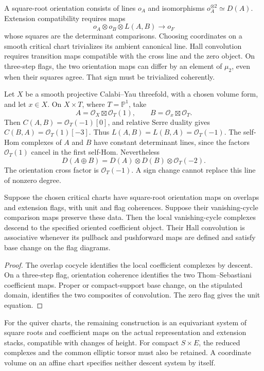 A square-root orientation consists of lines \(o_A\) and
isomorphisms \(o_A^{\otimes2}\simeq D(A)\). Extension
compatibility requires maps
\[
 o_A\otimes o_B\otimes L(A,B)\longrightarrow o_F
\]
whose squares are the determinant comparisons. Choosing coordinates
on a smooth critical chart trivializes its ambient canonical line.
Hall convolution requires transition maps compatible with the cross
line and the zero object. On three-step flags, the two orientation
maps can differ by an element of \(\mu_2\), even when their
squares agree. That sign must be trivialized coherently.

\begin{example}
Let \(X\) be a smooth projective Calabi--Yau threefold, with a
chosen volume form, and let \(x\in X\). On
\(X\times T\), where \(T=\mathbb P^1\), take
\[
 A=\mathcal O_X\boxtimes\mathcal O_T(1),\qquad
 B=\mathcal O_x\boxtimes\mathcal O_T.
\]
Then \(C(A,B)=\mathcal O_T(-1)[0]\), and relative Serre
duality gives \(C(B,A)=\mathcal O_T(1)[-3]\).
Thus \(L(A,B)=L(B,A)=\mathcal O_T(-1)\).
The self-Hom complexes of \(A\) and \(B\) have constant
determinant lines, since the factors \(\mathcal O_T(1)\)
cancel in the first self-Hom. Nevertheless
\[
 D(A\oplus B)=D(A)\otimes D(B)\otimes\mathcal O_T(-2).
\]
The orientation cross factor is \(\mathcal O_T(-1)\).
A sign change cannot replace this line of nonzero degree.
\end{example}

\begin{corollary}
Suppose the chosen critical charts have square-root orientation
maps on overlaps and extension flags, with unit and flag coherences.
Suppose their vanishing-cycle comparison maps preserve these data.
Then the local vanishing-cycle complexes descend to the specified
oriented coefficient object. Their Hall convolution is associative
whenever its pullback and pushforward maps are defined and satisfy
base change on the flag diagrams.
\end{corollary}
\begin{proof}
The overlap cocycle identifies the local coefficient complexes by
descent. On a three-step flag, orientation coherence identifies
the two Thom--Sebastiani coefficient maps. Proper or compact-support
base change, on the stipulated domain, identifies the two composites
of convolution. The zero flag gives the unit equation.
\end{proof}

For the quiver charts, the remaining construction is an equivariant
system of square roots and coefficient maps on the actual
representation and extension stacks, compatible with changes of
height. For compact \(S\times E\), the reduced complexes and
the common elliptic torsor must also be retained. A coordinate
volume on an affine chart specifies neither descent system by itself.


